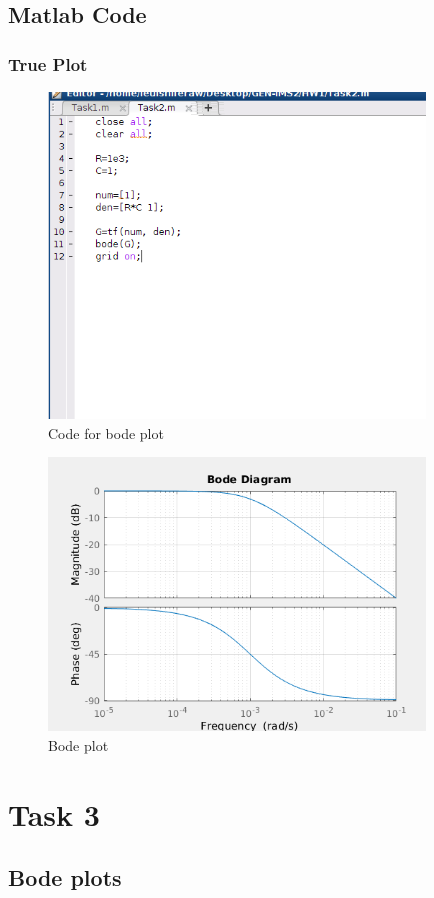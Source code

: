 \documentclass{article}
\begin{document}
		\subsection{Matlab Code}
			\subsubsection{True Plot}
			\begin{figure}[h!]
				\includegraphics[width=10cm]{Task2_code.png}
				\caption{Code for bode plot}
			\end{figure}
			\begin{figure}[h!]
				\includegraphics[width=10cm]{Task2_true.png}
				\caption{Bode plot}
			\end{figure}
	\newpage
	\section{Task 3}
		\subsection{Bode plots}
\end{document}
